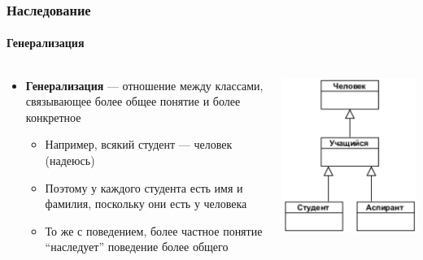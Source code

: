 \documentclass[xetex,mathserif,serif]{beamer}
\begin{document}
	\begin{frame}
		\frametitle{Наследование}
		\framesubtitle{Генерализация}
		\begin{columns}
			\begin{column}{0.75\textwidth}
				\begin{itemize}
					\item \textbf{Генерализация} --- отношение между классами, связывающее более общее понятие и более конкретное
					\begin{itemize}
						\item Например, всякий студент --- человек (надеюсь)
						\item Поэтому у каждого студента есть имя и фамилия, поскольку они есть у человека
						\item То же с поведением, более частное понятие ``наследует'' поведение более общего
					\end{itemize}
				\end{itemize}
			\end{column}
			\begin{column}{0.25\textwidth}
				\includegraphics[width=\textwidth]{inheritance.png}
			\end{column}
		\end{columns}
	\end{frame}
\end{document}
